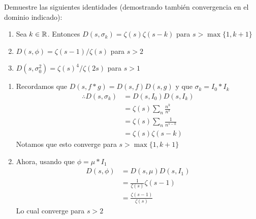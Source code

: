 \begin{prob}[2 pts. c/u]
    Demuestre las siguientes identidades (demostrando también convergencia en el dominio indicado):
    \begin{enumerate}[label = (\roman*)]
        \item Sea $k\in\mathbb{R}$. Entonces $D(s,\sigma_k)=\zeta(s)\zeta(s-k)$ para $s>\max\{1,k+1\}$

        \item $D(s,\phi)=\zeta(s-1)/\zeta(s)$ para $s>2$

        \item $D(s,\sigma_0^2)=\zeta(s)^4/\zeta(2s)$ para $s>1$
    \end{enumerate}
\end{prob}
\begin{sol}
    \begin{enumerate}[label = (\roman*)]
        \item Recordamos que $D(s,f*g)=D(s,f)D(s,g)$ y que $\sigma_k=I_0*I_k$
        \begin{align*}
            \therefore D(s,\sigma_k)&=D(s,I_0)D(s,I_k)\\
            &=\zeta(s)\sum_n\frac{n^k}{n^s}\\
            &=\zeta(s)\sum_n\frac{1}{n^{s-k}}\\
            &=\zeta(s)\zeta(s-k)
        \end{align*}
        Notamos que esto converge para $s>\max\{1,k+1\}$

        \item Ahora, usando que $\phi=\mu*I_1$
        \begin{align*}
            D(s,\phi)&=D(s,\mu)D(s,I_1)\\
            &=\frac{1}{\zeta(s)}\zeta(s-1)\\
            &=\frac{\zeta(s-1)}{\zeta(s)}
        \end{align*}
        Lo cual converge para $s>2$


\end{enumerate}
\end{sol}
